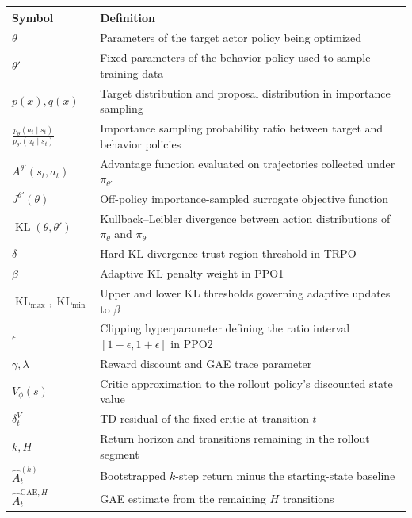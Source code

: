 \documentclass[11pt, a4paper]{article}
\begin{document}
\begin{table}[h!]
\centering
\begin{tabular}{@{}ll@{}}
\toprule
\textbf{Symbol} & \textbf{Definition} \\
\midrule
$\theta$ & Parameters of the target actor policy being optimized \\
$\theta'$ & Fixed parameters of the behavior policy used to sample training data \\
$p(x), q(x)$ & Target distribution and proposal distribution in importance sampling \\
$\frac{p_\theta(a_t \mid s_t)}{p_{\theta'}(a_t \mid s_t)}$ & Importance sampling probability ratio between target and behavior policies \\
$A^{\theta'}(s_t, a_t)$ & Advantage function evaluated on trajectories collected under $\pi_{\theta'}$ \\
$J^{\theta'}(\theta)$ & Off-policy importance-sampled surrogate objective function \\
$\operatorname{KL}(\theta, \theta')$ & Kullback--Leibler divergence between action distributions of $\pi_\theta$ and $\pi_{\theta'}$ \\
$\delta$ & Hard KL divergence trust-region threshold in TRPO \\
$\beta$ & Adaptive KL penalty weight in PPO1 \\
$\operatorname{KL}_{\max}, \operatorname{KL}_{\min}$ & Upper and lower KL thresholds governing adaptive updates to $\beta$ \\
$\epsilon$ & Clipping hyperparameter defining the ratio interval $[1 - \epsilon, 1 + \epsilon]$ in PPO2 \\
$\gamma,\lambda$ & Reward discount and GAE trace parameter \\
$V_\phi(s)$ & Critic approximation to the rollout policy's discounted state value \\
$\delta_t^V$ & TD residual of the fixed critic at transition $t$ \\
$k,H$ & Return horizon and transitions remaining in the rollout segment \\
$\hat A_t^{(k)}$ & Bootstrapped $k$-step return minus the starting-state baseline \\
$\hat A_t^{\mathrm{GAE},H}$ & GAE estimate from the remaining $H$ transitions \\
\bottomrule
\end{tabular}
\end{table}
\end{document}
